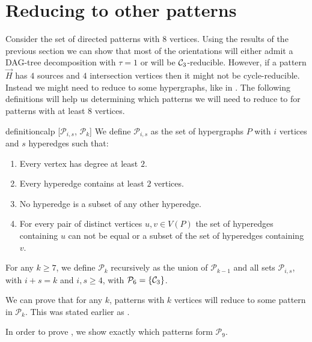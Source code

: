 \documentclass[a4paper,UKenglish,cleveref, autoref, numberwithinsect, thm-restate]{lipics-v2021}
\newcommand{\reducible}[1]{${#1}$-reducible}
\newcommand{\cycle}[1]{\cC_{#1}}
\newcommand{\dagtree}{DAG-tree decomposition}
\newcommand{\cC}{{\cal C}}
\newcommand{\cP}{\mathcal{P}}
\begin{document}
	\section{Reducing to other patterns} \label{sec:others}
	
	Consider the set of directed patterns with $8$ vertices. Using the results of the previous section we can show that most of the orientations will either admit a \dagtree{} with $\tau=1$ or will be \reducible{\cycle{3}}. However, if a pattern $\vec{H}$ has $4$ sources and $4$ intersection vertices then it might not be cycle-reducible. Instead we might need to reduce to some hypergraphs, like in . The following definitions will help us determining which patterns we will need to reduce to for patterns with at least $8$ vertices.
	
	\begin{restatable}{definition}{calp} [$\mathcal{P}_{i,s}$, $\mathcal{P}_k$] \label{def:group}
		We define $\mathcal{P}_{i,s}$ as the set of hypergraphs $P$ with $i$ vertices and $s$ hyperedges such that:
		\begin{enumerate}
			\item Every vertex has degree at least $2$.
			\item Every hyperedge contains at least $2$ vertices.
			\item No hyperedge is a subset of any other hyperedge.
			\item For every pair of distinct vertices $u,v \in V(P)$ the set of hyperedges containing $u$ can not be equal or a subset of the set of hyperedges containing $v$.
		\end{enumerate}
		For any $k\geq 7$, we define $\mathcal{P}_{k}$ recursively as the union of $\cP_{k-1}$ and all sets $\mathcal{P}_{i,s}$, with $i+s = k$ and $i,s\geq 4$, with $\cP_6=\{\cycle{3}\}$.
	\end{restatable}

	We can prove that for any $k$, patterns with $k$ vertices will reduce to some pattern in $\cP_k$. This was stated earlier as .
\pkcomputable*

	In order to prove , we show exactly which patterns form $\cP_9$.
	
\end{document}
